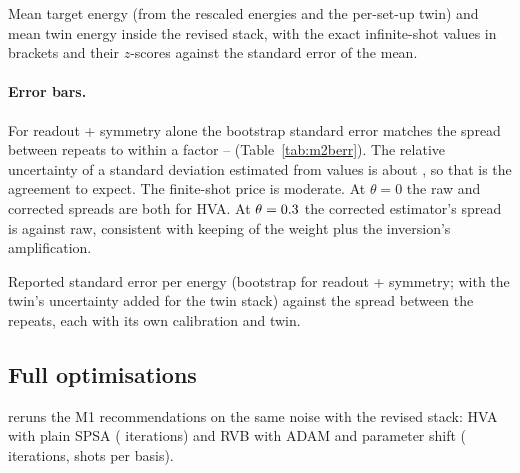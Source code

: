 \begin{table}[H]
  \centering
  \small
  \begin{adjustbox}{max width=\linewidth}
    
  \end{adjustbox}
  \caption{Mean target energy (from the rescaled energies and the per-set-up twin) and mean twin
    energy inside the revised stack, with the exact infinite-shot values in brackets and their
    $z$-scores against the standard error of the mean.}
  \label{tab:m2twinsplit}
\end{table}

\paragraph{Error bars.} For readout + symmetry alone the bootstrap standard error matches
the spread between repeats to within a factor \VMbSeRatioMin{}--\VMbSeRatioMax{}
(Table~\ref{tab:m2berr}). The relative uncertainty of a standard deviation estimated from
\VMbRepeats{} values is about \VMbSpreadRelErr{}, so that is the agreement to expect. The finite-shot
price is moderate. At $\theta=0$ the raw and corrected spreads are both
\VMbHvaFullZeroRawSpread{} for HVA. At $\theta=0.3$ the corrected
estimator's spread is \VMbHvaFullPtRoSymSpread{} against \VMbHvaFullPtRawSpread{} raw, consistent with
keeping \VMbKeptMinRoSym{} of the weight plus the inversion's amplification.

\begin{table}[H]
  \centering
  \small
  \begin{adjustbox}{max width=\linewidth}
    
  \end{adjustbox}
  \caption{Reported standard error per energy (bootstrap for readout + symmetry; with the
    twin's uncertainty added for the twin stack) against the spread between the
    \VMbRepeats{} repeats, each with its own calibration and twin.}
  \label{tab:m2berr}
\end{table}

\subsection{Full optimisations}

 reruns the M1 recommendations on the same noise with the
revised stack: HVA with plain SPSA (\VMwItersHvaSpsa{} iterations) and RVB with ADAM and
parameter shift (\VMwItersRvbPs{} iterations, \VMwShotsPerRvbPs{} shots per basis).

